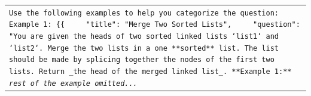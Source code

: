 \begin{table}[!th]
\begin{tabular}{>{\raggedright\arraybackslash\tt}p{}<{}}
Use the following examples to help you categorize the question:\newline%
\newline%
Example 1:\newline%
\{\{\newline%
~~~~"title": "Merge Two Sorted Lists",\newline%
~~~~"question": "You are given the heads of two sorted linked lists `list1` and `list2`.\newline%
Merge the two lists in a one **sorted** list. The list should be made by splicing together the nodes of the first two lists.\newline%
\newline%
Return \_the head of the merged linked list\_.\newline%
\newline%
**Example 1:**\newline%
\textit{rest of the example omitted...}
\newline%

\end{tabular}
\end{table}
